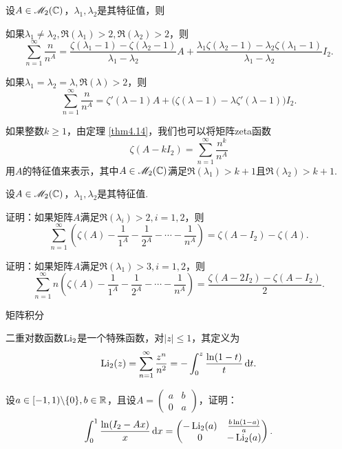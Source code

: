\begin{mybox}
  \begin{problem}[计算$\zeta(A-I_2)$.]

    设$A\in\mathscr M_2(\mathbb C)$，$\lambda_1,\lambda_2$是其特征值，则
    \begin{enum}
      \item 如果$\lambda_1\ne\lambda_2,\Re(\lambda_1)>2,
          \Re(\lambda_2)>2$，则
          \[
            \sum_{n=1}^\infty \frac n{n^A} = \frac{\zeta(\lambda_1-1)-\zeta(\lambda_2-1)}{
            \lambda_1-\lambda_2}A + \frac{
            \lambda_1\zeta(\lambda_2-1)-\lambda_2\zeta
            (\lambda_1-1)}{\lambda_1-\lambda_2}I_2.
          \]
      \item 如果$\lambda_1=\lambda_2=\lambda,\Re(\lambda)>2$，则
          \[
            \sum_{n=1}^\infty \frac n{n^A} = \zeta'(\lambda-1)A + \big( \zeta(\lambda-1)-\lambda\zeta'(\lambda-1) \big)I_2.
          \]
    \end{enum}
  \end{problem}
\end{mybox}
\begin{remark}
  如果整数$k\ge1$，由定理 \ref{thm4.14}，我们也可以将矩阵zeta函数
  \[
    \zeta(A-kI_2) = \sum_{n=1}^\infty \frac{n^k}{n^A}
  \]
  用$A$的特征值来表示，其中$A\in\mathscr M_2(\mathbb C)$满足$\Re(\lambda_1)>k+1$且$\Re(\lambda_2)>k+1$.
\end{remark}

\begin{mybox}
  \begin{problem}

   设$A\in\mathscr M_2(\mathbb C)$，$\lambda_1,\lambda_2$是其特征值.
   \begin{enum}
     \item 证明：如果矩阵$A$满足$\Re(\lambda_i)>2,i=1,2$，则
         \[
           \sum_{n=1}^\infty \left(\zeta(A) - \frac1{1^A} - \frac1{2^A} - \cdots - \frac1{n^A} \right) = \zeta(A-I_2)-\zeta(A).
         \]
     \item 证明：如果矩阵$A$满足$\Re(\lambda_1)>3,i=1,2$，则
         \[
           \sum_{n=1}^\infty n\left(\zeta(A) - \frac1{1^A} - \frac1{2^A} - \cdots - \frac1{n^A} \right) = \frac{\zeta(A-2I_2)-\zeta(A-I_2)}2.
         \]
   \end{enum}
  \end{problem}
\end{mybox}

{\kaishu 矩阵积分}
\begin{problem}
  {\kaishu 二重对数函数}$\operatorname{Li}_2$是一个特殊函数，对$|z|\le1$，其定义为
  \[
    \operatorname{Li}_2(z) = \sum_{n=1}^\infty \frac{z^n}{n^2} = -\int_0^z\frac{\ln(1-t)}t \mathop{}\!\mathrm d t.
  \]

  设$a\in[-1,1)\backslash\{0\},b\in\mathbb R$，且设$A=\begin{pmatrix}
    a & b \\
    0 & a
  \end{pmatrix}$，证明：
  \[
    \int_0^1 \frac{\ln(I_2-Ax)}x\mathop{}\!\mathrm d x = \begin{pmatrix}
      -\operatorname{Li}_2(a) & \frac{b\ln(1-a)}a \\
      0 & - \operatorname{Li}_2(a)
    \end{pmatrix}.
  \]
\end{problem}

